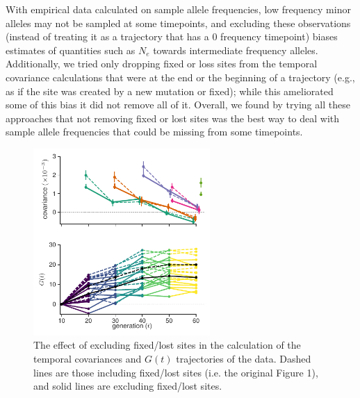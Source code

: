 \documentclass[11pt]{article}
\begin{document}
With empirical data calculated on sample allele frequencies, low frequency
minor alleles may not be sampled at some timepoints, and excluding these
observations (instead of treating it as a trajectory that has a 0 frequency
timepoint) biases estimates of quantities such as $N_e$ towards intermediate
frequency alleles. Additionally, we tried only dropping fixed or loss sites
from the temporal covariance calculations that were at the end or the beginning
of a trajectory (e.g., as if the site was created by a new mutation or fixed);
while this ameliorated some of this bias it did not remove all of it. Overall,
we found by trying all these approaches that not removing fixed or lost sites
was the best way to deal with sample allele frequencies that could be missing
from some timepoints.

\begin{figure}[!ht]
  \centering
  \includegraphics[width=0.6\textwidth]{figures/figure-1-G-covs-nofix.pdf}

  \caption{The effect of excluding fixed/lost sites in the calculation of the
  temporal covariances and $G(t)$ trajectories of the \textcite{Barghi2019-qy}
data. Dashed lines are those including fixed/lost sites (i.e. the original
Figure 1), and solid lines are excluding fixed/lost sites.}

  \label{suppfig:supp-fig-1-nofix}
\end{figure}
\end{document}
